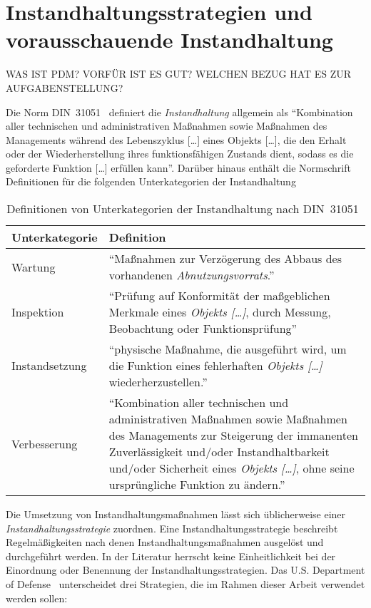 \chapter{Instandhaltungsstrategien und vorausschauende Instandhaltung}
\label{ch:instandhaltungsstrategien}
WAS IST PDM? VORFÜR IST ES GUT? WELCHEN BEZUG HAT ES ZUR AUFGABENSTELLUNG?

Die Norm DIN~\num{31051}~\cite{DIN.2019} definiert die \textit{Instandhaltung} allgemein als \enquote{Kombination aller technischen und administrativen Maßnahmen sowie Maßnahmen des Managements während des Lebenszyklus [\dots] eines Objekts [\dots], die den Erhalt oder der Wiederherstellung ihres funktionsfähigen Zustands dient, sodass es die geforderte Funktion [\dots] erfüllen kann}. Darüber hinaus enthält die Normschrift Definitionen für die folgenden Unterkategorien der Instandhaltung

\begin{table}[ht]
	\raggedright
	\begin{tabularx}{\textwidth}{ | l | X |}
		\hline
        \rowcolor{lightgray}
        Unterkategorie & Definition\\
        \hline
        Wartung & \enquote{Maßnahmen zur Verzögerung des Abbaus des vorhandenen \textit{Abnutzungsvorrats}.}\\
        \hline
        Inspektion & \enquote{Prüfung auf Konformität der maßgeblichen Merkmale eines \textit{Objekts […]}, durch Messung, Beobachtung oder Funktionsprüfung}\\
        \hline
        Instandsetzung & \enquote{physische Maßnahme, die ausgeführt wird, um die Funktion eines fehlerhaften \textit{Objekts […] }wiederherzustellen.}\\
        \hline
        Verbesserung & \enquote{Kombination aller technischen und administrativen Maßnahmen sowie Maßnahmen des Managements zur Steigerung der immanenten Zuverlässigkeit und/oder Instandhaltbarkeit und/oder Sicherheit eines \textit{Objekts […]}, ohne seine ursprüngliche Funktion zu ändern.}\\
        \hline
	\end{tabularx}
	\caption{Definitionen von Unterkategorien der Instandhaltung nach DIN~\num{31051}~\cite{DIN.2019}}%
	\label{tab:definition_unterkategorien_instandhaltung}	%
\end{table}

Die Umsetzung von Instandhaltungsmaßnahmen lässt sich üblicherweise einer \textit{Instandhaltungsstrategie} zuordnen. Eine Instandhaltungsstrategie beschreibt Regelmäßigkeiten nach denen Instandhaltungsmaßnahmen ausgelöst und durchgeführt werden. In der Literatur herrscht keine Einheitlichkeit bei der Einordnung oder Benennung der Instandhaltungsstrategien. Das U.S. Department of Defense~\cite[S.~16]{U.S.DepartmentofDefense.2008} unterscheidet drei Strategien, die im Rahmen dieser Arbeit verwendet werden sollen:

